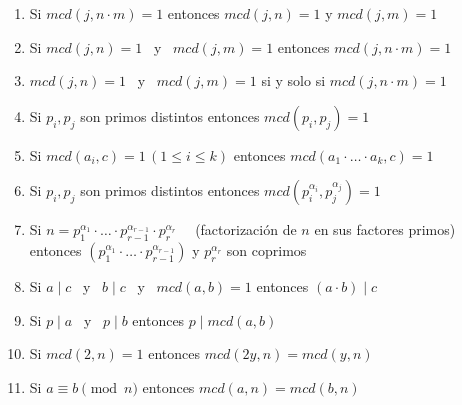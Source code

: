 \begin{enunciado} \label{enun:maspropMcd}\leavevmode\par
\begin{enumerate}[label=\roman*)]
\item Si $mcd(j, n \cdot m)=1$ entonces $mcd(j, n)=1$ y $mcd(j, m)=1$
\item Si $mcd(j, n)=1$ \, y \, $mcd(j, m)=1$ entonces $mcd(j, n \cdot m)=1$
\item $mcd(j, n)=1$ \, y \,  $mcd(j, m)=1$ si y solo si $mcd(j, n \cdot m)=1$
\item Si $p_{i}, p_{j}$ son primos distintos entonces $mcd(p_{i}, p_{j})=1$
\item Si $mcd(a_{i}, c)=1 \, (1 \leq i \leq k)$ entonces $mcd(a_{1} \cdot \ldots \cdot a_{k}, c)=1$
\item Si $p_{i}, p_{j}$ son primos distintos entonces $mcd(p_{i}^{\alpha_{i}}, p_{j}^{\alpha_{j}})=1$
\item Si $n=p_{1}^{\alpha_{1}} \cdot \ldots \cdot p_{r-1}^{\alpha_{r-1}} \cdot p_{r}^{\alpha_{r}} \quad$ (factorización de $n$ en sus factores primos) \\
entonces $(p_{1}^{\alpha_{1}} \cdot \ldots \cdot p_{r-1}^{\alpha_{r-1}})$ y $p_{r}^{\alpha_{r}}$ son coprimos
\item Si $a \mid c$ \, y \, $b \mid  c$ \, y \, $mcd(a, b)=1$ entonces $(a \cdot b) \mid c$
\item Si $p \mid a$ \, y \, $p \mid b$ entonces $p \mid mcd(a,b)$
\item Si $mcd(2,n) = 1$ entonces $mcd(2y,n) = mcd(y,n)$
\item Si $a \equiv b \pmod n$ entonces $mcd(a,n) = mcd(b,n)$
\end{enumerate}
\end{enunciado}

